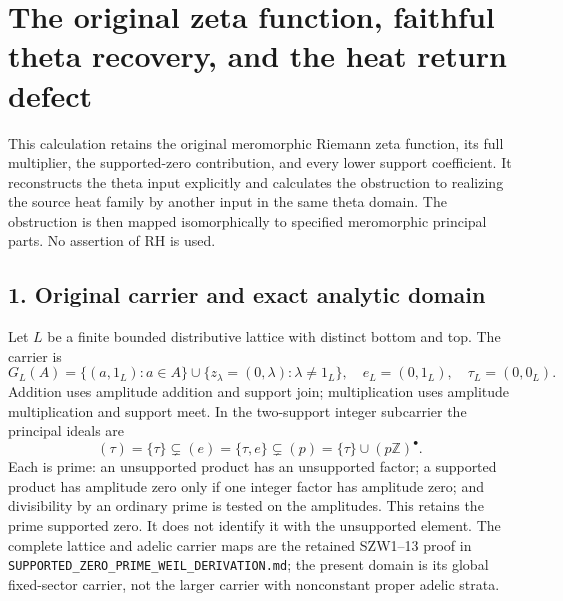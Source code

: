 \documentclass[
  10pt,
  a4paper,
]{article}
\author{}
\date{}
\begin{document}
{
\setcounter{tocdepth}{3}
\tableofcontents
}
\section{The original zeta function, faithful theta recovery, and the
heat return
defect}\label{the-original-zeta-function-faithful-theta-recovery-and-the-heat-return-defect}

This calculation retains the original meromorphic Riemann zeta function,
its full multiplier, the supported-zero contribution, and every lower
support coefficient. It reconstructs the theta input explicitly and
calculates the obstruction to realizing the source heat family by
another input in the same theta domain. The obstruction is then mapped
isomorphically to specified meromorphic principal parts. No assertion of
RH is used.

\subsection{1. Original carrier and exact analytic
domain}\label{original-carrier-and-exact-analytic-domain}

Let \(L\) be a finite bounded distributive lattice with distinct bottom
and top. The carrier is \[
G_L(A)=\{(a,1_L):a\in A\}\cup\{z_\lambda=(0,\lambda):\lambda\ne1_L\},
\quad e_L=(0,1_L),\quad\tau_L=(0,0_L).
\tag{TF1}
\] Addition uses amplitude addition and support join; multiplication
uses amplitude multiplication and support meet. In the two-support
integer subcarrier the principal ideals are \[
(\tau)=\{\tau\}\subsetneq(e)=\{\tau,e\}\subsetneq
(p)=\{\tau\}\cup(p\mathbb Z)^\bullet.
\tag{TF2}
\] Each is prime: an unsupported product has an unsupported factor; a
supported product has amplitude zero only if one integer factor has
amplitude zero; and divisibility by an ordinary prime is tested on the
amplitudes. This retains the prime supported zero. It does not identify
it with the unsupported element. The complete lattice and adelic carrier
maps are the retained SZW1--13 proof in
\texttt{SUPPORTED\_\allowbreak{}ZERO\_\allowbreak{}PRIME\_\allowbreak{}WEIL\_\allowbreak{}DERIVATION.\allowbreak{}md}; the present domain
is its global fixed-sector carrier, not the larger carrier with
nonconstant proper adelic strata.
\end{document}
